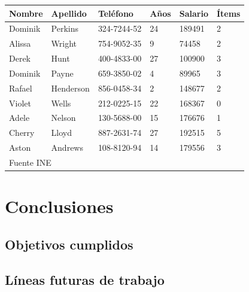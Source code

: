 \documentclass[12pt]{report} %
\begin{document}
\begin{table} [h]
	{\begin{tabular}{|p{1.75cm}|p{2cm}|p{2.5cm}|p{1.5cm}|p{2.5cm}|p{1.5cm}|}
		\hline
		\rowcolor{gray75}	
		Nombre & Apellido & Teléfono & Años & Salario & Ítems \\
		\hline 
		Dominik & Perkins & 324-7244-52 & 24 & 189491 & 2 \\
		\hline
		Alissa & Wright & 754-9052-35 & 9 & 74458 & 2 \\
		\hline
		Derek & Hunt & 400-4833-00 & 27 & 100900 & 3 \\
		\hline
		Dominik & Payne & 659-3850-02 & 4 & 89965 & 3 \\
		\hline
		Rafael & Henderson & 856-0458-34 & 2 & 148677 & 2 \\
		\hline
		Violet & Wells & 212-0225-15 & 22 & 168367 & 0\\
		\hline
		Adele & Nelson & 130-5688-00 & 15 & 176676 & 1 \\
		\hline
		Cherry & Lloyd & 887-2631-74 & 27 & 192515 & 5 \\
		\hline
		Aston & Andrews & 108-8120-94 & 14 & 179556 & 3 \\
		\hline
		\multicolumn{6}{|l|}{Fuente INE} \\
		\hline
	\end{tabular}}
\end{table}

\lipsum[6]

\chapter{Conclusiones}

\section{Objetivos cumplidos}
\lipsum[15-16]

\section{Líneas futuras de trabajo}
\lipsum[12-13]

	


\nocite{*} %
\end{document}
